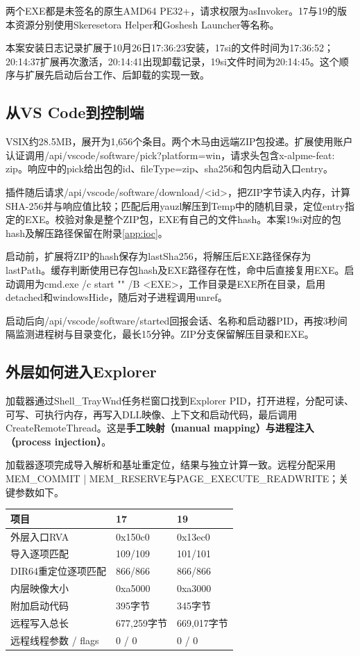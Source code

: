 \documentclass[UTF8,a4paper,zihao=5,fontset=windows]{ctexart}
\newcommand{\code}[1]{{\ttfamily\small #1}}
\begin{document}
两个EXE都是未签名的原生AMD64 PE32+，请求权限为\code{asInvoker}。17与19的版本资源分别使用Skeresetora Helper和Goshesh Launcher等名称。

本案安装日志记录扩展于10月26日17:36:23安装，17si的文件时间为17:36:52；20:14:37扩展再次激活，20:14:41出现卸载记录，19si文件时间为20:14:45。这个顺序与扩展先启动后台工作、后卸载的实现一致。

\subsection{从VS Code到控制端}
VSIX约28.5MB，展开为1,656个条目。两个木马由远端ZIP包投递。扩展使用账户认证调用\code{/api/vscode/software/pick?platform=win}，请求头包含\code{x-alpme-feat: zip}。响应中的\code{pick}给出包的\code{id}、\code{fileType=zip}、\code{sha256}和包内启动入口\code{entry}。

插件随后请求\code{/api/vscode/software/download/<id>}，把ZIP字节读入内存，计算SHA-256并与响应值比较；匹配后用\code{yauzl}解压到Temp中的随机目录，定位\code{entry}指定的EXE。校验对象是整个ZIP包，EXE有自己的文件hash。本案19si对应的包hash及解压路径保留在附录\ref{app:ioc}。

启动前，扩展将ZIP的hash保存为\code{lastSha256}，将解压后EXE路径保存为\code{lastPath}。缓存判断使用已存包hash及EXE路径存在性，命中后直接复用EXE。启动调用为\code{cmd.exe /c start "" /B <EXE>}，工作目录是EXE所在目录，启用\code{detached}和\code{windowsHide}，随后对子进程调用\code{unref}。

启动后向\code{/api/vscode/software/started}回报会话、名称和启动器PID，再按3秒间隔监测进程树与目录变化，最长15分钟。ZIP分支保留解压目录和EXE。

\subsection{外层如何进入Explorer}
加载器通过\code{Shell\_TrayWnd}任务栏窗口找到Explorer PID，打开进程，分配可读、可写、可执行内存，再写入DLL映像、上下文和启动代码，最后调用\code{CreateRemoteThread}。这是\textbf{手工映射（manual mapping）与进程注入（process injection）}。

加载器逐项完成导入解析和基址重定位，结果与独立计算一致。远程分配采用\code{MEM\_COMMIT | MEM\_RESERVE}与\code{PAGE\_EXECUTE\_READWRITE}；关键参数如下。
\par\medskip\noindent\begin{tabularx}{\linewidth}{@{}Y L{40mm}L{40mm}@{}}\toprule 项目 & 17 & 19\\\midrule
外层入口RVA & \code{0x150c0} & \code{0x13ec0}\\
导入逐项匹配 & 109/109 & 101/101\\
DIR64重定位逐项匹配 & 866/866 & 866/866\\
内层映像大小 & \code{0xa5000} & \code{0xa3000}\\
附加启动代码 & 395字节 & 345字节\\
远程写入总长 & 677,259字节 & 669,017字节\\
远程线程参数 / flags & 0 / 0 & 0 / 0\\\bottomrule\end{tabularx}\par\medskip
\end{document}
